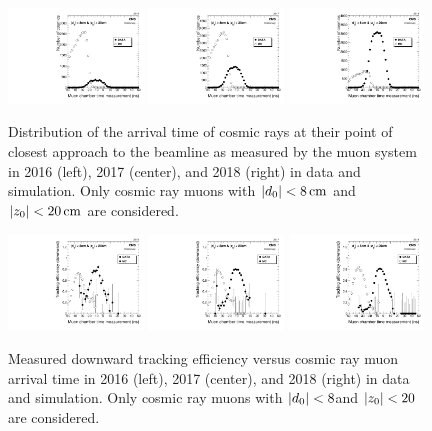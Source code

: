 \begin{figure}
\centering
\includegraphics[width=0.32\textwidth]{figures/tracking_eff/2016/Muon2TimeAve.pdf}
\includegraphics[width=0.32\textwidth]{figures/tracking_eff/2017/Muon2TimeAve.pdf}
\includegraphics[width=0.32\textwidth]{figures/tracking_eff/2018/Muon2TimeAve.pdf}
\caption{Distribution of the arrival time of cosmic rays at their point of closest approach to the beamline as measured by the muon system in 2016 (left), 2017 (center), and 2018 (right) in data and simulation. Only cosmic ray muons with $\ad<\SI{8}{\cm}$ and $\az<\SI{20}{\cm}$ are considered.}
\label{arrival_time}
\end{figure}

\begin{figure}[hbtp]
\centering
\includegraphics[width=0.32\textwidth]{figures/tracking_eff/2016/Eff0vsMuon2Time.pdf}
\includegraphics[width=0.32\textwidth]{figures/tracking_eff/2017/Eff0vsMuon2Time.pdf}
\includegraphics[width=0.32\textwidth]{figures/tracking_eff/2018/Eff0vsMuon2Time.pdf}
\caption{Measured downward tracking efficiency versus cosmic ray muon arrival time in 2016 (left), 2017 (center), and 2018 (right) in data and simulation. Only cosmic ray muons with $\lvert d_0 \rvert<8$\cm and $\lvert z_0 \rvert<20$\cm are considered.}
\label{trk_eff_vs_arrival_time}
\end{figure}